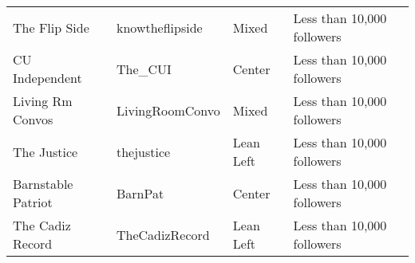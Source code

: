 \begin{tabular}{llll}
             The Flip Side &  knowtheflipside &         Mixed &                Less than 10,000 followers \\
            CU Independent &          The\_CUI &        Center &                Less than 10,000 followers \\
          Living Rm Convos &  LivingRoomConvo &         Mixed &                Less than 10,000 followers \\
               The Justice &       thejustice &     Lean Left &                Less than 10,000 followers \\
        Barnstable Patriot &          BarnPat &        Center &                Less than 10,000 followers \\
          The Cadiz Record &   TheCadizRecord &     Lean Left &                Less than 10,000 followers \\
\bottomrule
\end{tabular}

